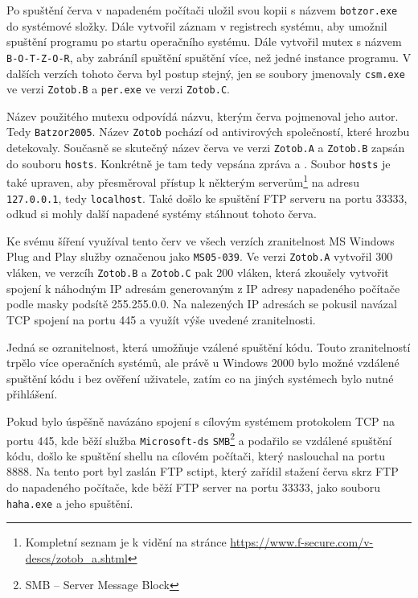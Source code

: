\documentclass[a4paper,12pt]{article}
\begin{document}
Po spuštění červa v napadeném počítači uložil svou kopii s názvem \texttt{botzor.exe} do systémové složky\cite{zotob-fsecure}. Dále vytvořil záznam v registrech systému, aby umožnil spuštění programu po startu operačního systému. Dále vytvořil mutex s názvem \texttt{B-O-T-Z-O-R}, aby zabráníl spuštění spuštění více, než jedné instance programu. V dalších verzích tohoto červa byl postup stejný, jen se soubory jmenovaly \texttt{csm.exe} ve verzi \texttt{Zotob.B} a \texttt{per.exe} ve verzi \texttt{Zotob.C}.

Název použitého mutexu odpovídá názvu, kterým červa pojmenoval jeho autor. Tedy \texttt{Batzor2005}. Název \texttt{Zotob} pochází od antivirových společností, které hrozbu detekovaly\cite{zotob-wikidot}. Současně se skutečný název červa ve verzi \texttt{Zotob.A} a \texttt{Zotob.B} zapsán do souboru \texttt{hosts}. Konkrétně je tam tedy vepsána zpráva  a \cite{zotob-fsecure}. Soubor \texttt{hosts} je také upraven, aby přesměroval přístup k některým serverům\footnote{Kompletní seznam je k vidění na stránce \url{https://www.f-secure.com/v-descs/zotob_a.shtml}} na adresu \texttt{127.0.0.1}, tedy \texttt{localhost}\cite{zotob-fsecure}. Také došlo ke spuštění FTP serveru na portu 33333, odkud si mohly další napadené systémy stáhnout tohoto červa\cite{zotob-fsecure}.

Ke svému šíření využíval tento červ ve všech verzích zranitelnost MS Windows Plug and Play služby označenou jako \texttt{MS05-039}\cite{zotob-fsecure}. Ve verzi \texttt{Zotob.A} vytvořil 300 vláken, ve verzcíh \texttt{Zotob.B} a \texttt{Zotob.C} pak 200 vláken, která zkoušely vytvořit spojení k náhodným IP adresám generovaným z IP adresy napadeného počítače podle masky podsítě 255.255.0.0\cite{zotob-fsecure}\cite{zotobb-fsecure}\cite{zotobc-fsecure}. Na nalezených IP adresách se pokusil navázal TCP spojení na portu 445 a využít výše uvedené zranitelnosti.

Jedná se ozranitelnost, která umožňuje vzálené spuštění kódu. Touto zranitelností trpělo více operačních systémů, ale právě u Windows 2000 bylo možné vzdálené spuštění kódu i bez ověření uživatele, zatím co na jiných systémech bylo nutné přihlášení\cite{zotob-ms}\cite{zotob-msbulletin}.

Pokud bylo úspěšně navázáno spojení s cílovým systémem protokolem TCP na portu 445, kde běží služba \texttt{Microsoft-ds} \texttt{SMB}\footnote{SMB -- Server Message Block} a podařilo se vzdálené spuštění kódu, došlo ke spuštění shellu na cílovém počítači, který naslouchal na portu 8888. Na tento port byl zaslán FTP sctipt, který zařídil stažení červa skrz FTP do napadeného počítače, kde běží FTP server na portu 33333, jako souboru \texttt{haha.exe} a jeho spuštění\cite{zotob-fsecure}\cite{zotobb-fsecure}.
\end{document}
